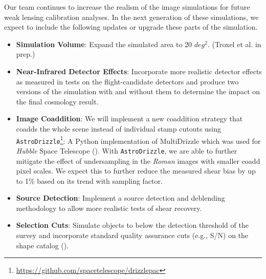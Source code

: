 \documentclass[fleqn,usenatbib]{mnras}
\begin{document}
Our team continues to increase the realism of the image simulations for future weak lensing calibration analyses. In the next generation of these simulations, we expect to include the following updates or upgrade these parts of the simulation. 
\begin{itemize}
    \setlength\itemsep{1em}
    \item \textbf{Simulation Volume}: Expand the simulated area to 20 $deg^{2}$. (Troxel et al. in prep.)
    
    \item \textbf{Near-Infrared Detector Effects}: Incorporate more realistic detector effects as measured in tests on the flight-candidate detectors and produce two versions of the simulation with and without them to determine the impact on the final cosmology result.
    
    \item \textbf{Image Coaddition}: We will implement a new coaddition strategy that coadds the whole scene instead of individual stamp cutouts using  \texttt{AstroDrizzle}\footnote{\url{https://github.com/spacetelescope/drizzlepac}}: A Python implementation of MultiDrizzle which was used for \emph{Hubble} Space Telescope (\citealt{2003hstc.conf..325B}). With \texttt{AstroDrizzle}, we are able to further mitigate the effect of undersampling in the \emph{Roman} images with smaller coadd pixel scales. We expect this to further reduce the measured shear bias by up to 1\% based on its trend with sampling factor.
    
    \item \textbf{Source Detection}: Implement a source detection and deblending methodology to allow more realistic tests of shear recovery.
    
    \item \textbf{Selection Cuts}: Simulate objects to below the detection threshold of the survey and incorporate standard quality assurance cuts (e.g., S/N) on the shape catalog (\citealt{2017ApJ...841...24S}). 
\end{itemize}
\end{document}
